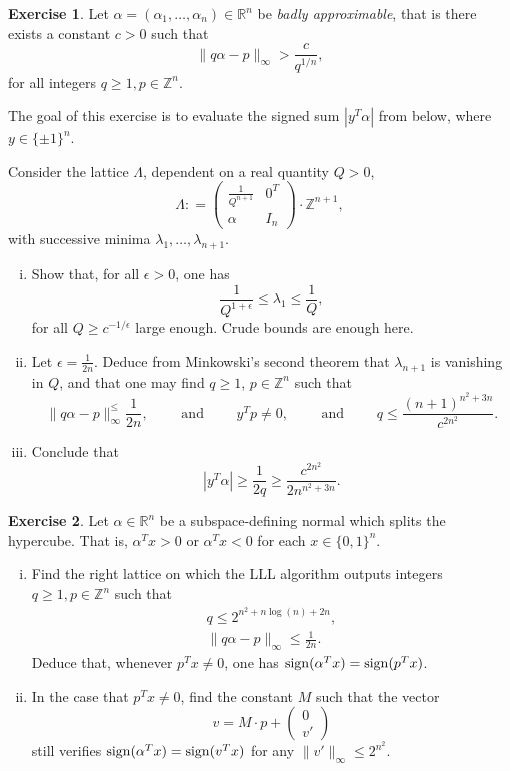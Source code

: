 \documentclass[12pt,a4paper]{article}
\theoremstyle{plain}
\newtheorem*{Sol*}{Solution}
\theoremstyle{definition}
\newtheorem{Ex}{Exercise}
\def \R {\mathbb R}
\def \Z {\mathbb Z}
\newcommand{\df}{\mathrel{\mathop:}=}
\newif\ifsolutions
\newcommand{\exercise}[2]{
			\begin{Ex} #1 \end{Ex}
			\ifsolutions  \begin{Sol*} #2 \end{Sol*} \bigskip \else \bigskip  \fi
		}
\begin{document}
\exercise{
	Let $\alpha = (\alpha_1, \dots, \alpha_n) \in \R^n$ be \emph{badly approximable}, that is there exists a constant $c > 0$ such that
		\[ \| q \alpha - p \|_\infty > \frac{c}{q^{1/n}}, \]
	for all integers $q \geq 1, p \in \Z^n$.

	The goal of this exercise is to evaluate the signed sum $| y^T \alpha |$ from below, where $y \in \{ \pm 1 \}^n$.

	Consider the lattice $\Lambda$, dependent on a real quantity $Q > 0$,
		\[ \Lambda \df \begin{pmatrix} \frac{1}{Q^{n+1}} & 0^T \\
								\alpha & I_n \end{pmatrix} \cdot \Z^{n+1}, \]
	with successive minima $\lambda_1, \dots, \lambda_{n+1}$.
	
	\begin{enumerate}[i)]
		\item 
		Show that, for all $\epsilon > 0$, one has
			\[ \frac{1}{Q^{1 + \epsilon}} \leq \lambda_1 \leq \frac{1}{Q}, \]
		for all $Q \geq c^{-1/\epsilon}$ large enough. Crude bounds are enough here.
		
		\item 
		Let $\epsilon = \frac1{2n}$. Deduce from Minkowski's second theorem that $\lambda_{n+1}$ is vanishing in $Q$, and that one may find $q \geq 1$, $p \in \Z^n$ such that
			\[ \| q \alpha - p \|_\infty^ \leq \frac{1}{2n}, \qquad \text{ and } \qquad y^T p \neq 0, \qquad \text{ and } \qquad q \leq \frac{(n+1)^{n^2 + 3n}}{c^{2n^2}}. \]
		
		\item
		Conclude that 
			\[ | y^T \alpha | \geq \frac{1}{2q} \geq \frac{c^{2n^2}}{2n^{n^2 + 3n}} . \]
	\end{enumerate}

}
{}

\exercise{
	Let $\alpha \in \R^n$ be a subspace-defining normal which splits the hypercube.
	That is, $\alpha^T x > 0$ or $\alpha^T x < 0$ for each $x \in \{0,1\}^n$.

	\begin{enumerate}[i)]
		\item Find the right lattice on which the LLL algorithm outputs integers $q \geq 1, p \in \Z^n$ such that
		\begin{gather*}
			q \leq 2^{n^2 + n \log(n) + 2n}, \\
			\| q \alpha - p \|_\infty \leq \frac{1}{2n}.
		\end{gather*}
		Deduce that, whenever $p^T x \neq 0$, one has ${\rm sign}(\alpha^T x) = {\rm sign}(p^Tx)$.
		
		\item
		In the case that $p^T x \neq 0$, find the constant $M$ such that the vector
			\[ v = M\cdot p + \begin{pmatrix}0 \\ v' \end{pmatrix} \]
		still verifies ${\rm sign}(\alpha^T x) = {\rm sign}(v^Tx)$ for any $\| v' \|_\infty \leq 2^{n^2}$.
	\end{enumerate}
}
{}
\end{document}
